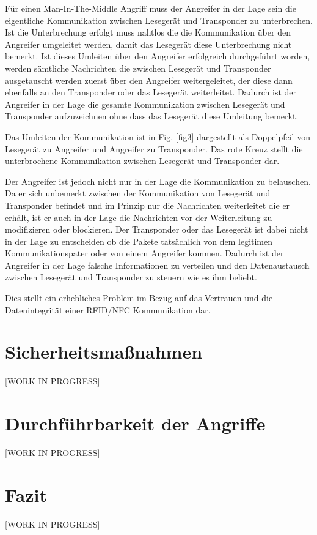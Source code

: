 \documentclass[conference]{IEEEtran}
\begin{document}
Für einen Man-In-The-Middle Angriff muss der Angreifer in der Lage sein die eigentliche Kommunikation zwischen Lesegerät und Transponder zu unterbrechen. Ist die Unterbrechung erfolgt muss nahtlos die die Kommunikation über den Angreifer umgeleitet werden, damit das Lesegerät diese Unterbrechung nicht bemerkt. Ist dieses Umleiten über den Angreifer erfolgreich durchgeführt worden, werden sämtliche Nachrichten die zwischen Lesegerät und Transponder ausgetauscht werden zuerst über den Angreifer weitergeleitet, der diese dann ebenfalls an den Transponder oder das Lesegerät weiterleitet. Dadurch ist der Angreifer in der Lage die gesamte Kommunikation zwischen Lesegerät und Transponder aufzuzeichnen ohne dass das Lesegerät diese Umleitung bemerkt.

Das Umleiten der Kommunikation ist in Fig. \ref{fig3} dargestellt als Doppelpfeil von Lesegerät zu Angreifer und Angreifer zu Transponder. Das rote Kreuz stellt die unterbrochene Kommunikation zwischen Lesegerät und Transponder dar.

Der Angreifer ist jedoch nicht nur in der Lage die Kommunikation zu belauschen. Da er sich unbemerkt zwischen der Kommunikation von Lesegerät und Transponder befindet und im Prinzip nur die Nachrichten weiterleitet die er erhält, ist er auch in der Lage die Nachrichten vor der Weiterleitung zu modifizieren oder blockieren. Der Transponder oder das Lesegerät ist dabei nicht in der Lage zu entscheiden ob die Pakete tatsächlich von dem legitimen Kommunikationspater oder von einem Angreifer kommen. Dadurch ist der Angreifer in der Lage falsche Informationen zu verteilen und den Datenaustausch zwischen Lesegerät und Transponder zu steuern wie es ihm beliebt.

Dies stellt ein erhebliches Problem im Bezug auf das Vertrauen und die Datenintegrität einer RFID/NFC Kommunikation dar.


\section{Sicherheitsmaßnahmen}
[WORK IN PROGRESS]


\section{Durchführbarkeit der Angriffe}
[WORK IN PROGRESS]


\section{Fazit}
[WORK IN PROGRESS]
\end{document}
